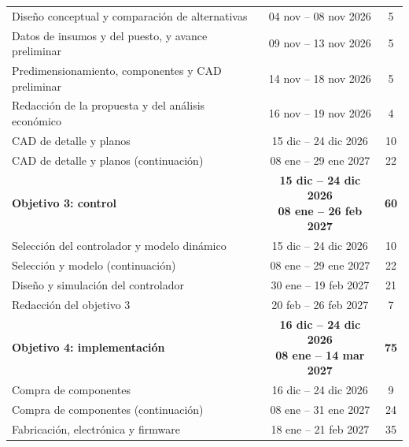 \begin{table}[H]
\begin{tabular}{lcc}
        \hspace{1em}Diseño conceptual y comparación de alternativas & 04 nov -- 08 nov 2026 & 5 \\
        \hspace{1em}Datos de insumos y del puesto, y avance preliminar & 09 nov -- 13 nov 2026 & 5 \\
        \hspace{1em}Predimensionamiento, componentes y CAD preliminar & 14 nov -- 18 nov 2026 & 5 \\
        \hspace{1em}Redacción de la propuesta y del análisis económico & 16 nov -- 19 nov 2026 & 4 \\
        \hspace{1em}CAD de detalle y planos & 15 dic -- 24 dic 2026 & 10 \\
        \hspace{1em}CAD de detalle y planos (continuación) & 08 ene -- 29 ene 2027 & 22 \\
        \rowcolor{lightgray!50}
        \textbf{Objetivo 3: control} & \shortstack{\textbf{15 dic -- 24 dic 2026}\\\textbf{08 ene -- 26 feb 2027}} & \textbf{60} \\
        \hspace{1em}Selección del controlador y modelo dinámico & 15 dic -- 24 dic 2026 & 10 \\
        \hspace{1em}Selección y modelo (continuación) & 08 ene -- 29 ene 2027 & 22 \\
        \hspace{1em}Diseño y simulación del controlador & 30 ene -- 19 feb 2027 & 21 \\
        \hspace{1em}Redacción del objetivo 3 & 20 feb -- 26 feb 2027 & 7 \\
        \rowcolor{lightgray!50}
        \textbf{Objetivo 4: implementación} & \shortstack{\textbf{16 dic -- 24 dic 2026}\\\textbf{08 ene -- 14 mar 2027}} & \textbf{75} \\
        \hspace{1em}Compra de componentes & 16 dic -- 24 dic 2026 & 9 \\
        \hspace{1em}Compra de componentes (continuación) & 08 ene -- 31 ene 2027 & 24 \\
        \hspace{1em}Fabricación, electrónica y firmware & 18 ene -- 21 feb 2027 & 35 \\

\end{tabular}
\end{table}
